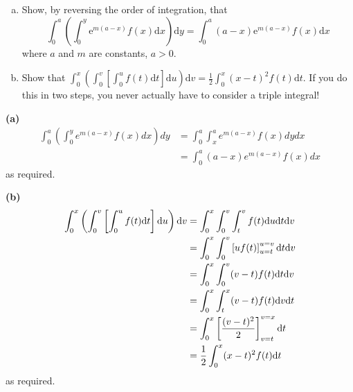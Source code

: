 \documentclass[a4paper, 12pt]{article}
\begin{document}
\begin{problem} 

\mbox{}
\begin{enumerate} [(a)]
    \item Show, by reversing the order of integration, that
        \[
            \int_0^a\left(\int_0^y \mathrm{e}^{m(a-x)} f(x) \mathrm{d} x\right) \mathrm{d} y=\int_0^a(a-x) \mathrm{e}^{m(a-x)} f(x) \mathrm{d} x
        \]
        where $a$ and $m$ are constants, $a>0$.
    \item Show that $\int_0^x\left(\int_0^v\left[\int_0^u f(t) \mathrm{d} t\right] \mathrm{d} u\right) \mathrm{d} v=\frac{1}{2} \int_0^x(x-t)^2 f(t) \mathrm{d} t$.
        If you do this in two steps, you never actually have to consider a triple integral!
\end{enumerate}
\end{problem}
\begin{solution}
    \textbf{(a)}
    \begin{align*}
        \int_0^a\left(\int_0^y e^{m(a-x)} f(x) dx\right) dy &= \int_{0}^{a} \int_{x}^{a} e^{m(a-x)} f(x) dy dx \\
        &= \int_{0}^{a} (a-x) e^{m(a-x)} f(x) dx
    \end{align*}
    as required.

    \textbf{(b)}
    \begin{align*}
        \int_0^x\left(\int_0^v\left[\int_0^u f(t) \mathrm{d} t\right] \mathrm{d} u\right) \mathrm{d} v &= \int_{0}^{x} \int_{0}^{v} \int_{t}^{v} f(t) \mathrm{d} u \mathrm{d} t \mathrm{d} v\\
        &= \int_{0}^{x} \int_{0}^{v} \left[u f(t)\right]_{u = t}^{u = v} \mathrm{d} t \mathrm{d} v\\
        &=\int_{0}^{x} \int_{0}^{v}(v-t)f(t) \mathrm{d} t \mathrm{d} v \\
        &= \int_{0}^{x} \int_{t}^{x} (v-t)f(t) \mathrm{d} v \mathrm{d} t \\
        &= \int_{0}^{x} \left[\frac{(v-t)^2}{2}\right]_{v = t}^{v = x} \mathrm{d} t \\
        &=\frac{1}{2} \int_0^x(x-t)^2 f(t) \mathrm{d} t
    \end{align*}
    as required.
\end{solution}
\end{document}
